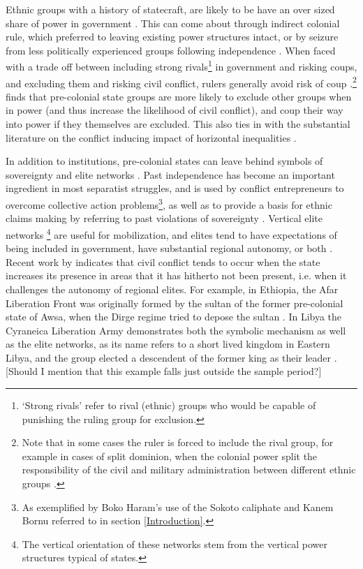 \documentclass[12pt]{article}
\begin{document}
Ethnic groups with a history of statecraft, are likely to be have an over sized
share of power in government \citep{Wucherpfennig2016}. This can come about
through indirect colonial rule, which preferred to leaving existing power
structures intact, or by seizure from less politically experienced groups
following independence \citep{Paine2019}. When faced with a trade off between
including strong rivals\footnote{`Strong rivals' refer to rival (ethnic) groups
who would be capable of punishing the ruling group for exclusion.} in government
and risking coups, and excluding them and risking civil conflict, rulers
generally avoid risk of coup \citep{Paine2019, Powell_2014,
Roessler_2011}.\footnote{Note that in some cases the ruler is forced to include
the rival group, for example in cases of split dominion, when the colonial power
split the responsibility of the civil and military administration between
different ethnic groups \citep{Paine2019}.} \citet{Paine2019} finds that
pre-colonial state groups are more likely to exclude other groups when in power
(and thus increase the likelihood of civil conflict), and coup their way into
power if they themselves are excluded. This also ties in with the substantial
literature on the conflict inducing impact of horizontal inequalities
\citep{CEDERMAN_2011}.

In addition to institutions, pre-colonial states can leave behind symbols of
sovereignty and elite networks \citep{Wishman}. Past independence has become an
important ingredient in most separatist struggles, and is used by conflict
entrepreneurs to overcome collective action problems\footnote{As exemplified by
Boko Haram's use of the Sokoto caliphate and Kanem Bornu referred to in section
\ref{Introduction}.}, as well as to provide a basis for ethnic claims making by
referring to past violations of sovereignty \citep{Ahram2019, Shelef2016}.
Vertical elite networks \footnote{The vertical orientation of these networks
stem from the vertical power structures typical of states.} are useful for
mobilization, and elites tend to have expectations of being included in
government, have substantial regional autonomy, or both \citep{Wishman}. Recent
work by \citet{Ying_2020} indicates that civil conflict tends to occur when the
state increases its presence in areas that it has hitherto not been present,
i.e. when it challenges the autonomy of regional elites. For example, in
Ethiopia, the Afar Liberation Front was originally formed by the sultan of the
former pre-colonial state of Awsa, when the Dirge regime tried to depose the
sultan \citep{Shehim1985, Hanfare2011}.  In Libya the Cyraneica Liberation Army
demonstrates both the symbolic mechanism as well as the elite networks, as its
name refers to a short lived kingdom in Eastern Libya, and the group elected a
descendent of the former king as their leader \citep{Ahram2019}. [Should I
mention that this example falls just outside the sample period?]
\end{document}
